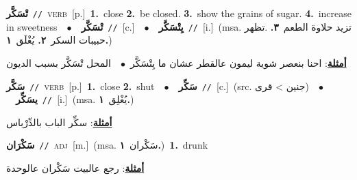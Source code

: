\documentclass[10pt,a4paper,twoside]{article} %
\begin{document}
\begin{multicols}{2}
{\setlength\topsep{0pt}\textbf{\foreignlanguage{arabic}{تْسَكَّر}}\ {\color{gray}\texttt{//}\color{black}}\ \textsc{verb}\ [p.]\ \textbf{1.}~close  \textbf{2.}~be closed.  \textbf{3.}~show the grains of sugar.  \textbf{4.}~increase in sweetness\ \ $\bullet$\ \ \setlength\topsep{0pt}\textbf{\foreignlanguage{arabic}{تْسَكَّر}}\ {\color{gray}\texttt{//}\color{black}}\ [c.]\ \ $\bullet$\ \ \setlength\topsep{0pt}\textbf{\foreignlanguage{arabic}{يِتْسَكَّر}}\ {\color{gray}\texttt{//}\color{black}}\ [i.]\ \color{gray}(msa. \foreignlanguage{arabic}{تزيد حلاوة الطعم}~\foreignlanguage{arabic}{\textbf{٣.}}  .\foreignlanguage{arabic}{تظهر حبيبات السكر}~\foreignlanguage{arabic}{\textbf{٢.}}  \foreignlanguage{arabic}{يُغْلَق}~\foreignlanguage{arabic}{\textbf{١.}})\color{black}\  \begin{flushright}\color{gray}\foreignlanguage{arabic}{\textbf{\underline{\foreignlanguage{arabic}{أمثلة}}}: احنا بنعصر شوية ليمون عالقطر عشان ما يِتْسَكَّر\ $\bullet$\ \  المحل تْسَكَّر بسبب الديون}\end{flushright}\color{black}} \vspace{2mm}

{\setlength\topsep{0pt}\textbf{\foreignlanguage{arabic}{سَكَّر}}\ {\color{gray}\texttt{//}\color{black}}\ \textsc{verb}\ [p.]\ \textbf{1.}~close  \textbf{2.}~shut\ \ $\bullet$\ \ \setlength\topsep{0pt}\textbf{\foreignlanguage{arabic}{سَكِّر}}\ {\color{gray}\texttt{//}\color{black}}\ [c.]\ (src. \color{gray}\foreignlanguage{arabic}{جنين > قرى}\color{black})\ \ $\bullet$\ \ \setlength\topsep{0pt}\textbf{\foreignlanguage{arabic}{يسَكِّر}}\ {\color{gray}\texttt{//}\color{black}}\ [i.]\ \color{gray}(msa. \foreignlanguage{arabic}{يُغْلِق}~\foreignlanguage{arabic}{\textbf{١.}})\color{black}\  \begin{flushright}\color{gray}\foreignlanguage{arabic}{\textbf{\underline{\foreignlanguage{arabic}{أمثلة}}}: سكِّر الباب بالدِّرْباس}\end{flushright}\color{black}} \vspace{2mm}

{\setlength\topsep{0pt}\textbf{\foreignlanguage{arabic}{سَكْرَان}}\ {\color{gray}\texttt{//}\color{black}}\ \textsc{adj}\ [m.]\ \color{gray}(msa. \foreignlanguage{arabic}{سَكْران}~\foreignlanguage{arabic}{\textbf{١.}})\color{black}\ \textbf{1.}~drunk\  \begin{flushright}\color{gray}\foreignlanguage{arabic}{\textbf{\underline{\foreignlanguage{arabic}{أمثلة}}}: رجع عالبيت سَكْران عالوحدة}\end{flushright}\color{black}} \vspace{2mm}


\end{multicols}
\end{document}
